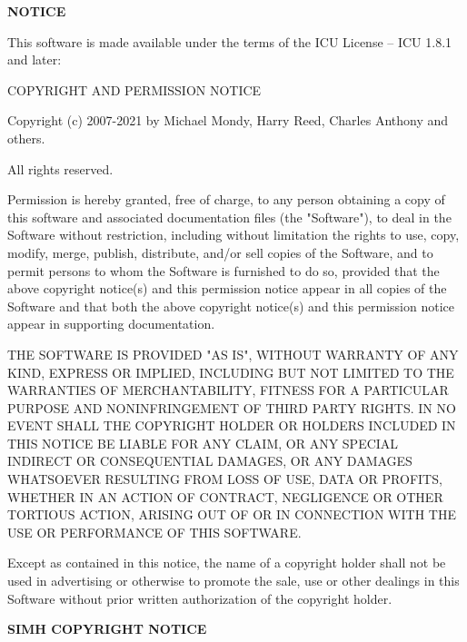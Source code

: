 \begin{center}
	\Large\bfseries NOTICE
\end{center}

\begin{center}
This software is made available under the terms of the ICU License -- ICU 1.8.1 and later:

COPYRIGHT AND PERMISSION NOTICE

Copyright (c) 2007-2021 by Michael Mondy, Harry Reed, Charles Anthony and
others.

All rights reserved.
\end{center}

Permission is hereby granted, free of charge, to any person obtaining a copy of
this software and associated documentation files (the "Software"), to deal in
the Software without restriction, including without limitation the rights to
use, copy, modify, merge, publish, distribute, and/or sell copies of the
Software, and to permit persons to whom the Software is furnished to do so,
provided that the above copyright notice(s) and this permission notice appear
in all copies of the Software and that both the above copyright notice(s) and
this permission notice appear in supporting documentation.

THE SOFTWARE IS PROVIDED "AS IS", WITHOUT WARRANTY OF ANY KIND, EXPRESS OR
IMPLIED, INCLUDING BUT NOT LIMITED TO THE WARRANTIES OF MERCHANTABILITY,
FITNESS FOR A PARTICULAR PURPOSE AND NONINFRINGEMENT OF THIRD PARTY RIGHTS. IN
NO EVENT SHALL THE COPYRIGHT HOLDER OR HOLDERS INCLUDED IN THIS NOTICE BE
LIABLE FOR ANY CLAIM, OR ANY SPECIAL INDIRECT OR CONSEQUENTIAL DAMAGES, OR ANY
DAMAGES WHATSOEVER RESULTING FROM LOSS OF USE, DATA OR PROFITS, WHETHER IN AN
ACTION OF CONTRACT, NEGLIGENCE OR OTHER TORTIOUS ACTION, ARISING OUT OF OR IN
CONNECTION WITH THE USE OR PERFORMANCE OF THIS SOFTWARE.

Except as contained in this notice, the name of a copyright holder shall not be
used in advertising or otherwise to promote the sale, use or other dealings in
this Software without prior written authorization of the copyright holder.

\newpage

\textbf{SIMH COPYRIGHT NOTICE}


